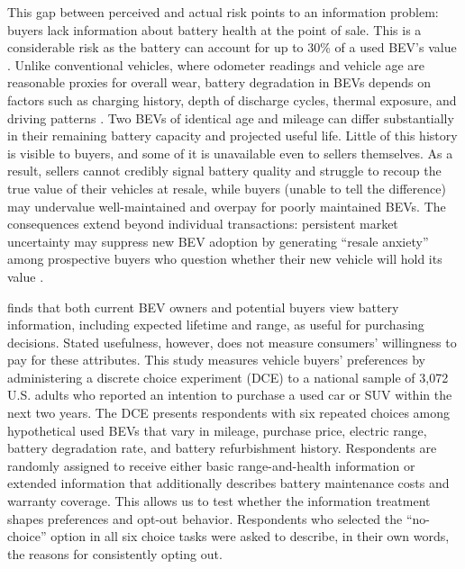 \documentclass[a4paper,fleqn]{cas-sc}   %
\begin{document}
This gap between perceived and actual risk points to an information problem: buyers lack information about battery health at the point of sale. This is a considerable risk as the battery can account for up to 30\% of a used BEV's value \parencite{boudwayBatteriesElectricCars2020}. Unlike conventional vehicles, where odometer readings and vehicle age are reasonable proxies for overall wear, battery degradation in BEVs depends on factors such as charging history, depth of discharge cycles, thermal exposure, and driving patterns \parencite{bashashPluginHybridElectric2011, neubauerSensitivityBatteryElectric2012}. Two BEVs of identical age and mileage can differ substantially in their remaining battery capacity and projected useful life. Little of this history is visible to buyers, and some of it is unavailable even to sellers themselves. As a result, sellers cannot credibly signal battery quality and struggle to recoup the true value of their vehicles at resale, while buyers (unable to tell the difference) may undervalue well-maintained and  overpay for poorly maintained BEVs. The consequences extend beyond individual transactions: persistent market uncertainty may suppress new BEV adoption by generating ``resale anxiety'' among prospective buyers who question whether their new vehicle will hold its value \parencite{bruckmannResaleAnxietyObstacle2021}. 

\textcite{webbConsumerPerspectivesBattery2025} finds that both current BEV owners and potential buyers view battery information, including expected lifetime and range, as useful for purchasing decisions. Stated usefulness, however, does not measure consumers' willingness to pay for these attributes. This study measures vehicle buyers' preferences by administering a discrete choice experiment (DCE) to a national sample of 3,072 U.S. adults who reported an intention to purchase a used car or SUV within the next two years. The DCE presents respondents with six repeated choices among hypothetical used BEVs that vary in mileage, purchase price, electric range, battery degradation rate, and battery refurbishment history. Respondents are randomly assigned to receive either basic range-and-health information or extended information that additionally describes battery maintenance costs and warranty coverage. This allows us to test whether the information treatment shapes preferences and opt-out behavior. Respondents who selected the ``no-choice'' option in all six choice tasks were asked to describe, in their own words, the reasons for consistently opting out.
\end{document}
